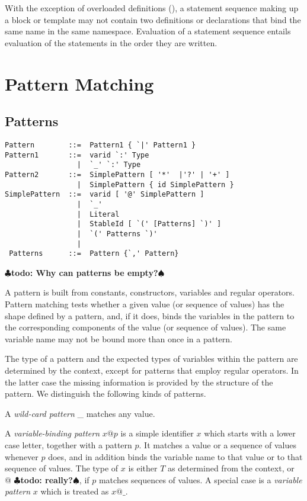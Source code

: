 \documentclass[a4paper,12pt,twoside,titlepage]{book}
\renewcommand{\todo}[1]{{$\clubsuit$\bf todo: #1$\spadesuit$}}
\begin{document}
With the exception of overloaded definitions
(), a statement sequence making up a block
or template may not contain two definitions or declarations that bind
the same name in the same namespace.  Evaluation of a statement
sequence entails evaluation of the statements in the order they are
written.

\chapter{Pattern Matching}

\section{Patterns}


\label{sec:patterns}

\syntax\begin{lstlisting}
Pattern        ::=  Pattern1 { `|' Pattern1 }
Pattern1       ::=  varid `:' Type
                 |  `_' `:' Type
Pattern2       ::=  SimplePattern [ '*'  |'?' | '+' ]
                 |  SimplePattern { id SimplePattern }
SimplePattern  ::=  varid [ '@' SimplePattern ]
                 |  `_'
                 |  Literal
                 |  StableId [ `(' [Patterns] `)' ]
                 |  `(' Patterns `)'
                 |   
 Patterns      ::=  Pattern {`,' Pattern}
\end{lstlisting}

\todo{Why can patterns be empty?}

A pattern is built from constants, constructors, variables and regular
operators. Pattern matching tests whether a given value (or sequence
of values) has the shape defined by a pattern, and, if it does, binds
the variables in the pattern to the corresponding components of the
value (or sequence of values).  The same variable name may not be
bound more than once in a pattern.

The type of a pattern and the expected types of variables within the
pattern are determined by the context, except for patterns
that employ regular operators. In the latter case  the missing 
information is provided by the structure of the pattern. 
We distinguish the following kinds of patterns.

A {\em wild-card pattern} \_ matches any value. 

A {\em variable-binding pattern} $x @ p$ is a simple identifier $x$
which starts with a lower case letter, together with a pattern $p$. It
matches a value or a sequence of values whenever $p$ does, and in
addition binds the variable name to that value or to that sequence of
values. The type of $x$ is either $T$ as determined from the context, or
\lstinline@List[$T\,$]@ \todo{really?}, if $p$ matches sequences of values. A
special case is a {\em variable pattern} $x$ which is treated as $x @ \_$. 
\end{document}
